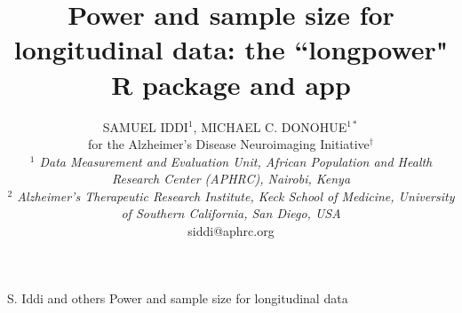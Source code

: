 \documentclass[oupdraft]{bio}
\begin{document}
	
	\title{Power and sample size for longitudinal data: the ``longpower" R package and app}
	
	\author{SAMUEL IDDI$^1$, MICHAEL C. DONOHUE$^{1\ast}$\\[4pt]
		for the Alzheimer's Disease Neuroimaging Initiative$^\dagger$\\[4pt]
		\textit{$^1$ Data Measurement and Evaluation Unit,
			African Population and Health Research Center (APHRC),
			Nairobi, Kenya\\
		$^2$ 	Alzheimer's Therapeutic Research Institute,
		Keck School of Medicine,
		University of Southern California,
		San Diego, USA}
		\\[2pt]
		{siddi@aphrc.org}}
	
	\markboth%
	{S. Iddi and others}
	{Power and sample size for longitudinal data}
	
	\maketitle
	
	
\end{document}
